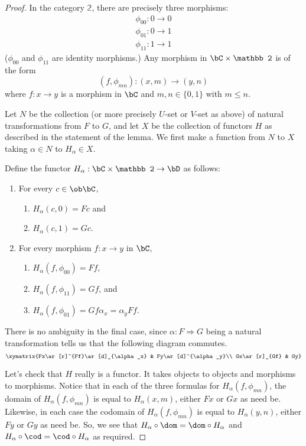 \documentclass[main.tex]{subfiles}
\begin{document}
\begin{proof}
	In the category ${\mathbb 2}$, there are precisely three morphisms:
	\[\begin{array}{l}\phi_{00}:0\rightarrow 0\\ \phi_{01}:0\rightarrow 1\\
	\phi_{11}:1\rightarrow 1\end{array}\] ($\phi_{00}$ and $\phi_{11}$ are
	identity morphisms.) Any morphism in $\bC\times\mathbb 2$ is of the form
	\[(f,\phi_{mn}):(x,m)\rightarrow(y,n)\] where $f:x\rightarrow y$ is a
	morphism in $\bC$ and $m,n\in\{0,1\}$ with $m\le n$.

	Let $N$ be the collection (or more precisely $U$-set or $V$-set as above) of
	natural transformations from $F$ to $G$, and let $X$ be the collection of
	functors $H$ as described in the statement of the lemma. We first make a
	function from $N$ to $X$ taking $\alpha\in N$ to $H_\alpha\in X$.

	Define the functor $H_\alpha:\bC\times{\mathbb 2}\rightarrow\bD$ as follows:
	\begin{enumerate}
		\item For every $c\in\ob\bC$,
			\begin{enumerate}
				\item $H_\alpha(c,0)=Fc$ and
				\item $H_\alpha(c,1)=Gc$.
			\end{enumerate}
		\item For every morphism $f:x\rightarrow y$ in $\bC$,
			\begin{enumerate}
				\item $H_\alpha(f,\phi_{00})=Ff$,
				\item $H_\alpha(f,\phi_{11})=Gf$, and
				\item $H_\alpha(f,\phi_{01})=Gf\alpha_x=\alpha_yFf$.
			\end{enumerate}
	\end{enumerate}
	There is no ambiguity in the final case, since $\alpha:F\Rightarrow G$ being
	a natural transformation tells us that the following diagram commutes.
	\[\xymatrix{Fx\ar[r]^{Ff}\ar[d]_{\alpha_x} & Fy\ar[d]^{\alpha_y}\\
	Gx\ar[r]_{Gf} & Gy}\]

	Let's check that $H$ really is a functor. It takes objects to objects and
	morphisms to morphisms. Notice that in each of the three  formulas for
	$H_\alpha(f,\phi_{mn})$, the domain of $H_\alpha(f,\phi_{mn})$ is equal to
	$H_\alpha(x,m)$, either $Fx$ or $Gx$ as need be. Likewise, in each case the
	codomain of $H_\alpha(f,\phi_{mn})$ is equal to $H_\alpha(y,n)$, either $Fy$
	or $Gy$ as need be. So, we see that $H_\alpha\circ\dom=\dom\circ H_\alpha$
	and $H_\alpha\circ\cod=\cod\circ H_\alpha$ as required.


\end{proof}
\end{document}

